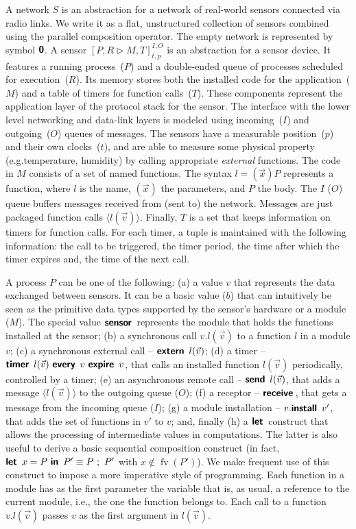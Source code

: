 \documentclass[copyright,creativecommons]{eptcs}
\newcommand{\keyw}[1]{\textbf{\textsf{#1}}\,}
\newcommand{\inaction}{\textbf{\textsf{0}}}
\newcommand{\installk}{\keyw{install}}
\newcommand{\ink}{\keyw{in}}
\newcommand{\systemk}{\keyw{extern}}
\newcommand{\letk}{\keyw{let}}
\newcommand{\sendk}{\keyw{send}}
\newcommand{\firek}{\keyw{timer}}
\newcommand{\everyk}{\keyw{every}}
\newcommand{\expirek}{\keyw{expire}}
\newcommand{\receivek}{\keyw{receive}}
\newcommand{\branek}{\keyw{sensor}}
\newcommand{\selfk}{\text{self}}
\newcommand{\sensor}[6]{[{#1} \triangleright {#2}]^{{#3}, {#4}}_{{#5}, {#6}}}
\newcommand{\sensord}{\sensor {P,R} {M, T} I O t p}
\newcommand{\invk}[3]{{#1}.{#2}({#3})}
\newcommand{\invkd}{\invk {v}{l}{\vec v}}
\newcommand{\system}[1]{\systemk\ {#1}}
\newcommand{\systemd}{\system {\msgd}}
\newcommand{\fire}[3]{\firek\ {#1}\ \everyk\ {#2}\ \expirek\ {#3}}
\newcommand{\fired}{\fire {\msgd} v v}
\newcommand{\send}[1]{\sendk\ {#1}}
\newcommand{\sendd}{\send {\msgd}}
\newcommand{\msg}[2]{{#1}({#2})}
\newcommand{\msgd}{\msg l {\vec v}}
\newcommand{\receivedd}{\receivek}
\newcommand{\install}[2]{{#1}.\installk\ {#2}}
\newcommand{\fv}{\operatorname{fv}}
\begin{document}
A network $S$ is an abstraction for a network of real-world sensors
connected via radio links. We write it as a flat, unstructured
collection of sensors combined using the parallel composition
operator. The empty network is represented by symbol $\inaction$.
A sensor $\sensord$ is an abstraction for a sensor device.  It
features a running process~($P$) and a double-ended
queue of processes scheduled for execution~($R$). Its memory stores
both the installed code for the application~($M$) and a table of
timers for function calls~($T$). These components represent the
application layer of the protocol stack for the sensor. The interface
with the lower level networking and data-link layers is modeled using
incoming~($I$) and outgoing~($O$) queues of messages.
The sensors have a measurable position~($p$) and their own
clocks~($t$), and are able to measure some physical property
(e.g.\@ temperature, humidity) by calling appropriate \emph{external}
functions.
The code in $M$ consists of a set of named functions.
The syntax $l = (\vec x) P$ represents a function, where $l$ is the name,
$(\vec x)$ the parameters, and $P$ the body.
The $I$ ($O$) queue buffers messages received from (sent to) the
network. Messages are just packaged function calls
$\langle l(\vec v)\rangle$.
Finally, $T$ is a set that keeps information on timers for function
calls. For each timer, a tuple is maintained with the following
information: the call to be triggered, the timer period, the
time after which the timer expires and, the time of the next
call.

A process $P$ can be one of the following: 
(a) a value $v$ that represents
the data exchanged between sensors. It can be a basic value ($b$) that
can intuitively be seen as the primitive data types supported by the
sensor's hardware or a module ($M$). The special value $\branek$
represents the module that holds the functions installed at the
sensor; 
(b) a synchronous call $\invkd$ to a function $l$ in a module $v$;
(c) a synchronous external call -- $\systemd$; 
(d) a timer -- $\fired$, that
calls an installed function $l(\vec v)$ periodically, controlled by a
timer; 
(e) an asynchronous remote call -- $\sendd$, that adds a message
$\langle l(\vec v)\rangle$ to the outgoing queue ($O$); 
(f) a receptor --
$\receivedd$, that gets a message from the incoming queue ($I$); 
(g) a module installation -- $\install v{v'}$, that adds the set of
functions in $v'$ to $v$; and, finally 
(h) a $\letk$ construct that
allows the processing of intermediate values in computations.
The latter is also useful to derive a basic sequential composition
construct (in fact, $\letk\ x = P\ \ink\ P' \equiv P~;~P'$ with $x
\not\in \fv(P')$). We make frequent use of this construct to impose a
more imperative style of programming.
Each function in a module has as the first parameter the variable
\selfk{} that is, as usual, a reference to the current module, i.e.,
the one the function belongs to. Each call to a function $v.l(\vec v)$
passes $v$ as the first argument in $l(\vec v)$.
\end{document}
